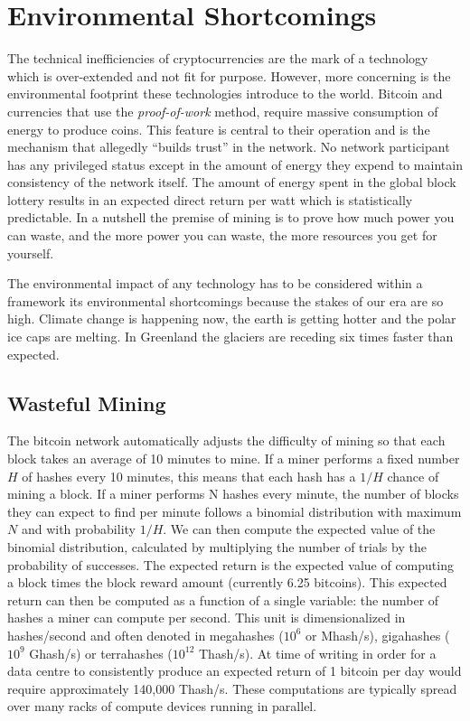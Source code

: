 \chapter{Environmental Shortcomings}

The technical inefficiencies of cryptocurrencies are the mark of a technology
which is over-extended and not fit for purpose. However, more concerning is the
environmental footprint these technologies introduce to the world. Bitcoin and
currencies that use the \textit{proof-of-work} method, require massive
consumption of energy to produce coins. This feature is central to their
operation and is the mechanism that allegedly ``builds trust'' in the network.
No network participant has any privileged status except in the amount of energy
they expend to maintain consistency of the network itself. The amount of energy
spent in the global block lottery results in an expected direct return per watt
which is statistically predictable. In a nutshell the premise of mining is to
prove how much power you can waste, and the more power you can waste, the more
resources you get for yourself. \cite{gerard2017attack}

The environmental impact of any technology has to be considered within a
framework its environmental shortcomings because the stakes of our era are so
high. Climate change is happening now, the earth is getting hotter and the polar
ice caps are melting. In Greenland the glaciers are receding six times faster
than expected.

\section{Wasteful Mining}

The bitcoin network automatically adjusts the difficulty of mining so that each
block takes an average of 10 minutes to mine. If a miner performs a fixed number
$H$ of hashes every 10 minutes, this means that each hash has a $1/H$ chance of
mining a block. If a miner performs N hashes every minute, the number of blocks
they can expect to find per minute follows a binomial distribution with maximum
$N$ and with probability $1/H$. We can then compute the expected value of the
binomial distribution, calculated by multiplying the number of trials by the
probability of successes. The expected return is the expected value of computing
a block times the block reward amount (currently 6.25 bitcoins). This expected
return can then be computed as a function of a single variable: the number of
hashes a miner can compute per second.  This unit is dimensionalized in
hashes/second and often denoted in megahashes ($10^6$ or Mhash/s), gigahashes
($10^9$ Ghash/s) or terrahashes ($10^{12}$ Thash/s). At time of writing in order
for a data centre to consistently produce an expected return of 1 bitcoin per
day would require approximately 140,000 Thash/s.  These computations are
typically spread over many racks of compute devices running in parallel.

